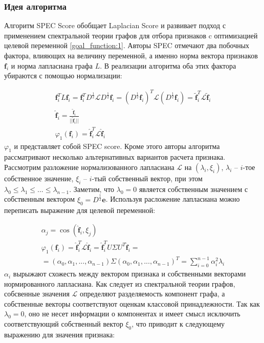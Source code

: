 \subsubsection{Идея алгоритма}
Алгоритм SPEC Score обобщает Laplacian Score и развивает подход с применением спектральной теории графов для отбора признаков c оптимизацией целевой переменной \ref{goal_function:1}. Авторы SPEC отмечают два побочных фактора, влияющих на величину переменной, а именно норма вектора признаков $\mathbf{f}_i $ и норма лапласиана графа $L$. В реализации алгоритма оба этих фактора убираются с помощью нормализации\cite{zhao2007spectral}:

\begin{equation}
	\begin{array}{l}
	\mathbf{f}_i^T L \mathbf{f}_i = \mathbf{f}_i^T D^\frac12 \mathcal{L} D^\frac12 \mathbf{f}_i = (D^\frac12 \mathbf{f}_i)^T \mathcal{L} (D^\frac12 \mathbf{f}_i) = \widetilde{\mathbf{f}}_i^T \mathcal{L} \widetilde{\mathbf{f}}_i \\
	\widehat{\mathbf{f}}_i = \frac{\widetilde{\mathbf{f}}_i}{||\widetilde{\mathbf{f}}_i||} \\
	\varphi_1(\mathbf{f}_i) = \widehat{\mathbf{f}}_i^T \mathcal{L} \widehat{\mathbf{f}}_i
	\end{array}
\end{equation}
$\varphi_1$ и представляет собой SPEC score. Кроме этого авторы алгоритма рассматривают несколько альтернативных вариантов расчета признака. Рассмотрим разложение нормализованного лапласиана $\mathcal{L}$ на $(\lambda_i, \xi_i)$, $\lambda_i$ -- $i$-тое собственное значение, $\xi_i$ -- $i$-тый собственный вектор, при этом $\lambda_0 \leq \lambda_1 \leq ... \leq \lambda_{n-1}$. Заметим, что $\lambda_0 = 0$ является собственным значением с собственным вектором $\xi_0 = D^\frac12 \mathbf{e}$. Используя расложение лапласиана можно переписать выражение для целевой переменной:

\begin{equation}
	\begin{array}{l}
		\alpha_j = \cos(\widehat{\mathbf{f}}_i, \xi_j)\\
		\varphi_1(\mathbf{f}_i) = \widehat{\mathbf{f}}_i^T \mathcal{L} \widehat{\mathbf{f}}_i = \widehat{\mathbf{f}}_i^T U \Sigma U^T \widehat{\mathbf{f}}_i = \\
		= (\alpha_0, \alpha_1, ... , \alpha_{n-1}) \Sigma (\alpha_0, \alpha_1, ... , \alpha_{n-1})^T = \sum_{i=0}^{n-1} \alpha_i^2 \lambda_i
	\end{array} 
\end{equation}
$\alpha_i$ вырыжают схожесть между вектором признака и собственными векторами нормированного лапласиана. Как следует из спектральной теории графов, собсвенные значения $\mathcal{L}$ определяют разделяемость компонент графа, а собственные векторы соответствуют оценкам классовой принадлежности. Так как $\lambda_0 = 0$, оно не несет информации о компонентах и имеет смысл исключить соответствующий собственный вектор $\xi_0$, что приводит к следующему выражению для значения признака:

